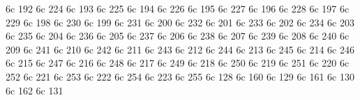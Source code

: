 \characterdef \CYRA          6c  192
\characterdef \cyra          6c  224
\characterdef \CYRB          6c  193
\characterdef \cyrb          6c  225
\characterdef \CYRV          6c  194
\characterdef \cyrv          6c  226
\characterdef \CYRG          6c  195
\characterdef \cyrg          6c  227
\characterdef \CYRD          6c  196
\characterdef \cyrd          6c  228
\characterdef \CYRE          6c  197
\characterdef \cyre          6c  229
\characterdef \CYRZH         6c  198
\characterdef \cyrzh         6c  230
\characterdef \CYRZ          6c  199
\characterdef \cyrz          6c  231
\characterdef \CYRI          6c  200
\characterdef \cyri          6c  232
\characterdef \CYRISHRT      6c  201
\characterdef \cyrishrt      6c  233
\characterdef \CYRK          6c  202
\characterdef \cyrk          6c  234
\characterdef \CYRL          6c  203
\characterdef \cyrl          6c  235
\characterdef \CYRM          6c  204
\characterdef \cyrm          6c  236
\characterdef \CYRN          6c  205
\characterdef \cyrn          6c  237
\characterdef \CYRO          6c  206
\characterdef \cyro          6c  238
\characterdef \CYRP          6c  207
\characterdef \cyrp          6c  239
\characterdef \CYRR          6c  208
\characterdef \cyrr          6c  240
\characterdef \CYRS          6c  209
\characterdef \cyrs          6c  241
\characterdef \CYRT          6c  210
\characterdef \cyrt          6c  242
\characterdef \CYRU          6c  211
\characterdef \cyru          6c  243
\characterdef \CYRF          6c  212
\characterdef \cyrf          6c  244
\characterdef \CYRH          6c  213
\characterdef \cyrh          6c  245
\characterdef \CYRC          6c  214
\characterdef \cyrc          6c  246
\characterdef \CYRCH         6c  215
\characterdef \cyrch         6c  247
\characterdef \CYRSH         6c  216
\characterdef \cyrsh         6c  248
\characterdef \CYRSHCH       6c  217
\characterdef \cyrshch       6c  249
\characterdef \CYRHRDSN      6c  218
\characterdef \cyrhrdsn      6c  250
\characterdef \CYRERY        6c  219
\characterdef \cyrery        6c  251
\characterdef \CYRSFTSN      6c  220
\characterdef \cyrsftsn      6c  252
\characterdef \CYREREV       6c  221
\characterdef \cyrerev       6c  253
\characterdef \CYRYU         6c  222
\characterdef \cyryu         6c  254
\characterdef \CYRYA         6c  223
\characterdef \cyrya         6c  255
\characterdef \CYRPHK        6c  128
\characterdef \cyrphk        6c  160
\characterdef \CYRTETSE      6c  129
\characterdef \cyrtetse      6c  161
\characterdef \CYRTDSC       6c  130
\characterdef \cyrtdsc       6c  162
\characterdef \CYRGHK        6c  131
